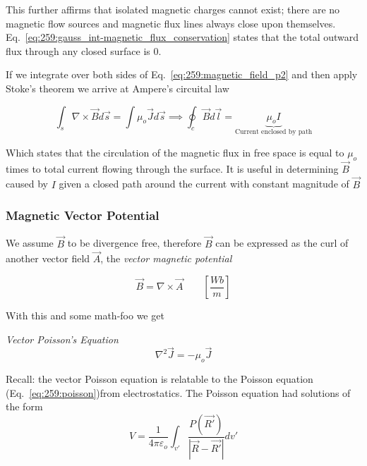 \documentclass[10pt]{article}
\begin{document}
This further affirms that isolated magnetic charges cannot exist; there are no magnetic flow sources and magnetic flux lines always close upon themselves. 
Eq.~\ref{eq:259:gauss_int-magnetic_flux_conservation} states that the total outward flux through any closed surface is 0.


If we integrate over both sides of Eq.~\ref{eq:259:magnetic_field_p2} and then apply Stoke's theorem we arrive at Ampere's circuital law

\begin{equation}
	\int_s \nabla \times \vec{B} d\vec{s} = \int \mu_o \vec{J} d\vec{s} \implies \oint_c \vec{B} d\vec{l} = \underbrace{\mu_o I}_{\text{Current enclosed by path}}
\end{equation}

Which states that the circulation of the magnetic flux in free space is equal to $ \mu_o $ times to total current flowing through the surface. 
It is useful in determining $ \vec{B} $ caused by $ I $ given a closed path around the current with constant magnitude of $ \vec{B} $ 


\subsubsection{Magnetic Vector Potential}
We assume $ \vec{B} $  to be divergence free, therefore $ \vec{B} $  can be expressed as the curl of another vector field $ \vec{A} $, the \textit{vector magnetic potential} 

\begin{equation}
	\vec{B} = \nabla \times \vec{A} \qquad [\frac{Wb}{m}]
	 \label{eq:259:vector_magnetic_potential}
\end{equation}

With this and some math-foo we get 


\begin{definition}
	\textit{Vector Poisson's Equation} 
	\begin{equation}
		\nabla^2 \vec{J} = -\mu_o \vec{J}
		\label{eq:259:vector_poisson_eq}
	\end{equation}
\end{definition}

\begin{blockquote}
	Recall: the vector Poisson equation is relatable to the Poisson equation (Eq.~\ref{eq:259:poisson})from electrostatics.
	The Poisson equation had solutions of the form
	\begin{equation}
		V = \frac{1}{4\pi\varepsilon_o} \int_{v'} \frac{P(\vec{R'})}{|\vec{R}-\vec{R'}|} dv'
	\end{equation}

\end{blockquote}
\end{document}
